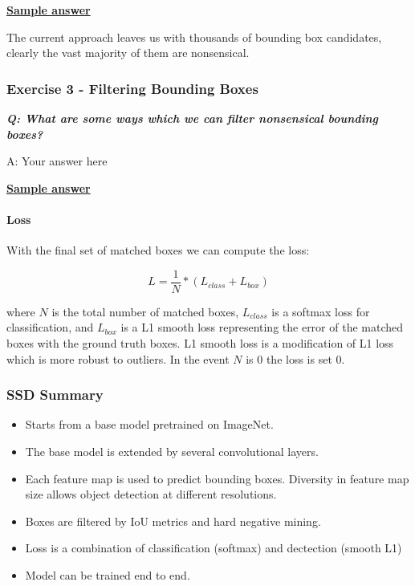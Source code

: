 \documentclass[11pt]{article}
\providecommand{\tightlist}{%
      \setlength{\itemsep}{0pt}\setlength{\parskip}{0pt}}
\begin{document}
\textbf{\href{./exercise-solutions/e2.md}{Sample answer}}

    The current approach leaves us with thousands of bounding box
candidates, clearly the vast majority of them are nonsensical.

\hypertarget{exercise-3---filtering-bounding-boxes}{%
\subsubsection{Exercise 3 - Filtering Bounding
Boxes}\label{exercise-3---filtering-bounding-boxes}}

\textbf{\emph{Q: What are some ways which we can filter nonsensical
bounding boxes?}}

    A: Your answer here

\textbf{\href{./exercise-solutions/e3.md}{Sample answer}}

    \hypertarget{loss}{%
\paragraph{Loss}\label{loss}}

With the final set of matched boxes we can compute the loss:

\[
L = \frac {1} {N} * ( L_{class} + L_{box})
\]

where \(N\) is the total number of matched boxes, \(L_{class}\) is a
softmax loss for classification, and \(L_{box}\) is a L1 smooth loss
representing the error of the matched boxes with the ground truth boxes.
L1 smooth loss is a modification of L1 loss which is more robust to
outliers. In the event \(N\) is 0 the loss is set 0.

    \hypertarget{ssd-summary}{%
\subsubsection{SSD Summary}\label{ssd-summary}}

\begin{itemize}
\tightlist
\item
  Starts from a base model pretrained on ImageNet.
\item
  The base model is extended by several convolutional layers.
\item
  Each feature map is used to predict bounding boxes. Diversity in
  feature map size allows object detection at different resolutions.
\item
  Boxes are filtered by IoU metrics and hard negative mining.
\item
  Loss is a combination of classification (softmax) and dectection
  (smooth L1)
\item
  Model can be trained end to end.
\end{itemize}
\end{document}
